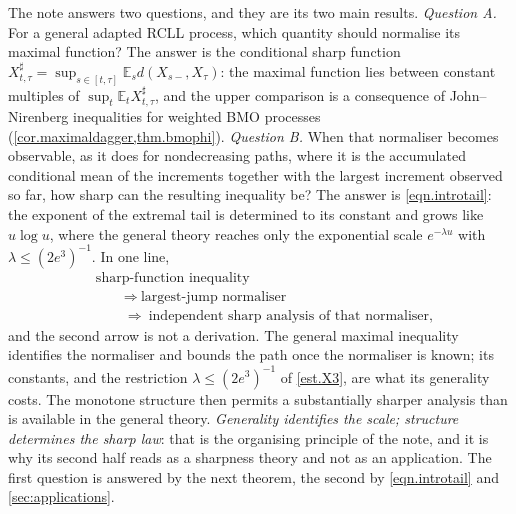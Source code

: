 \documentclass[12pt,oneside,reqno,fleqn]{amsart}
\numberwithin{equation}{section}
\theoremstyle{remark}
\newcommand\mE{{\mathbb E}}
\newcommand\E{\mE}
\newcommand{\1}{{\mathbf 1}}
\renewcommand{\le}{\leq}
\begin{document}
	The note answers two questions, and they are its two main results. \emph{Question A.} For a general adapted RCLL process, which quantity should normalise its maximal function? The answer is the conditional sharp function $X^\sharp_{t,\tau}=\sup_{s\in[t,\tau]}\E_sd(X_{s-},X_\tau)$: the maximal function lies between constant multiples of $\sup_t\E_tX^\sharp_{t,\tau}$, and the upper comparison is a consequence of John--Nirenberg inequalities for weighted BMO processes (\cref{cor.maximaldagger,thm.bmophi}). \emph{Question B.} When that normaliser becomes observable, as it does for nondecreasing paths, where it is the accumulated conditional mean of the increments together with the largest increment observed so far, how sharp can the resulting inequality be? The answer is \eqref{eqn.introtail}: the exponent of the extremal tail is determined to its constant and grows like $u\log u$, where the general theory reaches only the exponential scale $e^{-\lambda u}$ with $\lambda\le(2e^3)^{-1}$. In one line,
	\[
	\begin{aligned}
	&\text{sharp-function inequality}\\
	&\qquad\Longrightarrow\ \text{largest-jump normaliser}\\
	&\qquad\Longrightarrow\ \text{independent sharp analysis of that normaliser},
	\end{aligned}
	\]
	and the second arrow is not a derivation. The general maximal inequality identifies the normaliser and bounds the path once the normaliser is known; its constants, and the restriction $\lambda\le(2e^3)^{-1}$ of \eqref{est.X3}, are what its generality costs. The monotone structure then permits a substantially sharper analysis than is available in the general theory. \emph{Generality identifies the scale; structure determines the sharp law}: that is the organising principle of the note, and it is why its second half reads as a sharpness theory and not as an application. The first question is answered by the next theorem, the second by \eqref{eqn.introtail} and \cref{sec:applications}.
\end{document}
